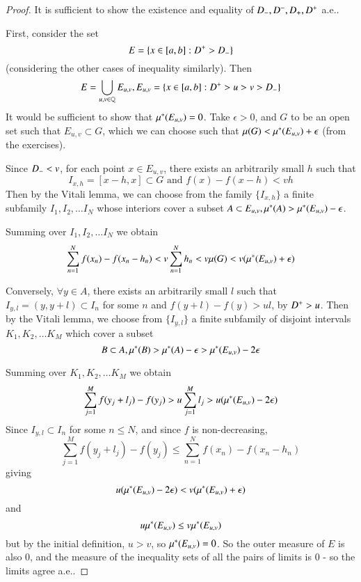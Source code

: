 \documentclass[11pt,a4paper]{report}
\theoremstyle{plain}
\theoremstyle{definition}
\theoremstyle{remark}
\newcommand{\Union}{\bigcup}
\newcommand{\Q}{\mathbb{Q}}
\begin{document}
\begin{proof}
  It is sufficient to show the existence and equality of $D_{-}, D^{-}, D_{+}, D^{+}$ a.e..

  First, consider the set
  $$ E = \{ x \in [a, b] : D^{+} > D_{-} \} $$
  (considering the other cases of inequality similarly). Then
  $$ E = \Union_{u, v \in \Q} E_{u, v}, E_{u, v} = \{ x \in [a, b] : \Dpu > u > v > \Dml \} $$
  It would be sufficient to show that $\mu^{*}(E_{u, v}) = 0$. Take $\epsilon > 0$, and $G$ to be an open set such that $E_{u, v} \subset G$, which we can choose such that $\mu(G) < \mu^{*}(E_{u, v}) + \epsilon$ (from the exercises).

  Since $D_{-} < v$, for each point $x \in E_{u, v}$, there exists an arbitrarily small $h$ such that
  $$ I_{x, h} = [ x - h, x] \subset G \text{ and } f(x) - f(x-h) < vh $$
  Then by the Vitali lemma, we can choose from the family $\{ I_{x, h} \}$ a finite subfamily $I_1, I_2, \dots I_N$ whose interiors cover a subset $A \subset E_{u, v}, \mu^{*}(A) > \mu^{*}(E_{u, v}) - \epsilon$.

  Summing over $I_1, I_2, \dots I_N$ we obtain
  $$ \sum_{n=1}^N f(x_n) - f(x_n - h_n) < v \sum_{n=1}^N h_n < v \mu(G) < v (\mu^{*}(E_{u, v}) + \epsilon) $$

  Conversely, $\forall y \in A$, there exists an arbitrarily small $l$ such that $I_{y, l} = (y, y + l) \subset I_n$ for some $n$ and $ f(y + l) - f(y) > ul$, by $D^{+} > u$. Then by the Vitali lemma, we choose from $\{ I_{y, l}\}$ a finite subfamily of disjoint intervals $K_1, K_2, \dots K_M$ which cover a subset 
  $$ B \subset A, \mu^{*}(B) > \mu^{*}(A) - \epsilon > \mu^{*}(E_{u, v}) - 2\epsilon $$

  Summing over $K_1, K_2, \dots K_M$ we obtain
    $$ \sum_{j=1}^M f(y_j + l_j) - f(y_j) > u\sum_{j=1}^M l_j >  u(\mu^{*}(E_{u, v}) - 2\epsilon) $$
    Since $I_{y, l} \subset I_n$ for some $n \le N$, and since $f$ is non-decreasing, 
    $$ \sum_{j=1}^M f(y_j + l_j) - f(y_j) \le \sum_{n=1}^N f(x_n) - f(x_n - h_n) $$
    giving
    $$ u(\mu^{*}(E_{u, v}) - 2\epsilon) < v(\mu^{*}(E_{u, v}) + \epsilon) $$
    and
    $$ u\mu^{*}(E_{u, v}) \le v\mu^{*}(E_{u, v}) $$
    but by the initial definition, $u > v$, so $\mu^{*}(E_{u, v}) = 0$. So the outer measure of $E$ is also 0, and the measure of the inequality sets of all the pairs of limits is $0$ - so the limits agree a.e..


\end{proof}
\end{document}

